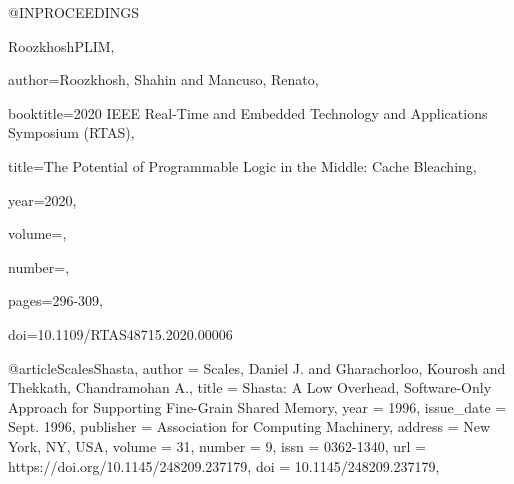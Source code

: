 {@INPROCEEDINGS{RoozkhoshPLIM,

  author={Roozkhosh, Shahin and Mancuso, Renato},

  booktitle={2020 IEEE Real-Time and Embedded Technology and Applications Symposium (RTAS)}, 

  title={The Potential of Programmable Logic in the Middle: Cache Bleaching}, 

  year={2020},

  volume={},

  number={},

  pages={296-309},

  doi={10.1109/RTAS48715.2020.00006}}


@article{ScalesShasta,
author = {Scales, Daniel J. and Gharachorloo, Kourosh and Thekkath, Chandramohan A.},
title = {Shasta: A Low Overhead, Software-Only Approach for Supporting Fine-Grain Shared Memory},
year = {1996},
issue_date = {Sept. 1996},
publisher = {Association for Computing Machinery},
address = {New York, NY, USA},
volume = {31},
number = {9},
issn = {0362-1340},
url = {https://doi.org/10.1145/248209.237179},
doi = {10.1145/248209.237179},
}}
